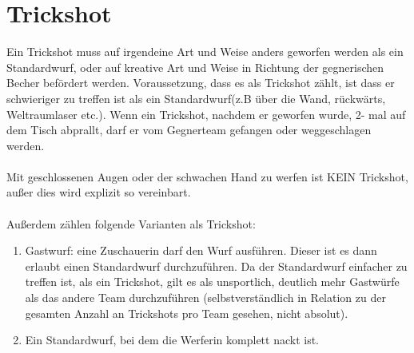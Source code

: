 \documentclass[a5paper, 12pt]{book}
\begin{document}
\section{Trickshot}\label{trickshot}
Ein Trickshot muss auf irgendeine Art und Weise anders geworfen werden als ein Standardwurf, oder auf kreative Art und Weise in Richtung der gegnerischen Becher befördert werden. Voraussetzung, dass es als Trickshot zählt, ist dass er schwieriger zu treffen ist als ein Standardwurf(z.B über die Wand, rückwärts, Weltraumlaser etc.). Wenn ein Trickshot, nachdem er geworfen wurde, 2- mal auf dem Tisch abprallt, darf er vom Gegnerteam gefangen oder weggeschlagen werden.\\\\
Mit geschlossenen Augen oder der schwachen Hand zu werfen ist KEIN Trickshot, außer dies wird explizit so vereinbart.\\\\
Außerdem zählen folgende Varianten als Trickshot:
\begin{enumerate}[(1)]
    \item Gastwurf: eine Zuschauerin darf den Wurf ausführen. Dieser ist es dann erlaubt einen Standardwurf durchzuführen. Da der Standardwurf einfacher zu treffen ist, als ein Trickshot, gilt es als unsportlich, deutlich mehr Gastwürfe als das andere Team durchzuführen (selbstverständlich in Relation zu der gesamten Anzahl an Trickshots pro Team gesehen, nicht absolut).
    \item Ein Standardwurf, bei dem die Werferin komplett nackt ist.
\end{enumerate}
\end{document}
